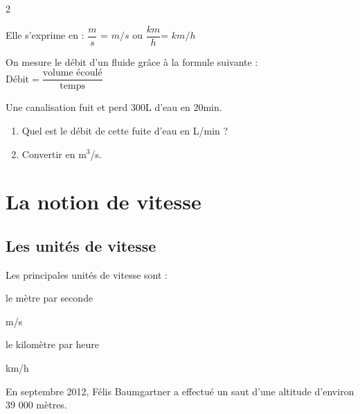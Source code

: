 \documentclass[a4paper,10pt]{report}
\begin{document}
\begin{multicols}{2}
\begin{ex}
\noindent Elle s'exprime en :	\quad $\dfrac{m}{s}$ = $m/s$ \quad ou \quad $\dfrac{km}{h}$= $km/h$
\end{ex}

\vspace{-3mm}
\begin{meth}
On mesure le débit d'un fluide grâce à la formule suivante : \quad $\text{Débit}=\dfrac{\text{volume écoulé}}{\text{temps}}$

\noindent Une canalisation fuit et perd $300$L d'eau en $20$min.
\begin{enumerate}
\item Quel est le débit de cette fuite d'eau en L/min ?

\medskip
\noindent\grandscarreaux{\linewidth}{0.8cm}
\item Convertir en m$^3$/s.

\medskip
\noindent\grandscarreaux{\linewidth}{0.8cm}
\end{enumerate}
\end{meth}

\vspace{-3mm}
\section{La notion de vitesse}

\vspace{-2mm}
\subsection{Les unités de vitesse}

\vspace{-3mm}
\noindent Les principales unités de vitesse sont :
\begin{minipage}{0.48\linewidth}
\begin{center}
le mètre par seconde

\Large{m/s}
\end{center}
\end{minipage}
\begin{minipage}{0.48\linewidth}
\begin{center}
le kilomètre par heure

\Large{km/h}
\end{center}
\end{minipage}

\vspace{-3mm}
\begin{ex}
En septembre 2012, Félis Baumgartner a effectué un saut d'une altitude d'environ 39 000 mètres.


\end{ex}
\end{multicols}
\end{document}
